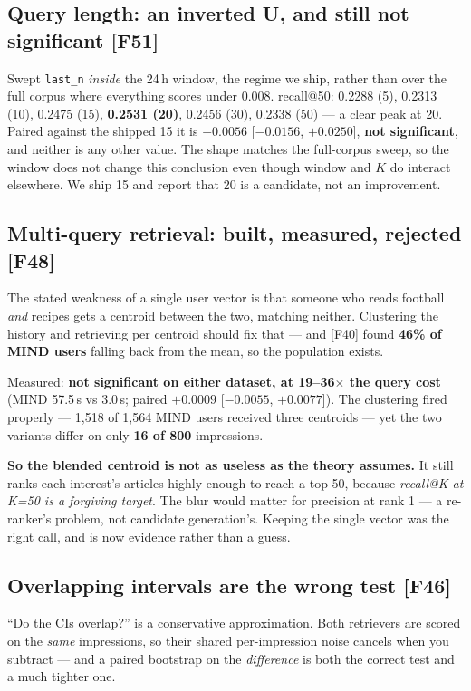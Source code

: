 \documentclass[10pt,a4paper]{article}
\newcommand{\F}[1]{\textcolor{blue!55!black}{\footnotesize[#1]}}
\begin{document}
\subsection{Query length: an inverted U, and still not significant \F{F51}}

Swept \texttt{last\_n} \emph{inside} the 24\,h window, the regime we ship, rather than over the full
corpus where everything scores under 0.008. recall@50: 0.2288 (5), 0.2313 (10), 0.2475 (15),
\textbf{0.2531 (20)}, 0.2456 (30), 0.2338 (50) --- a clear peak at 20. Paired against the shipped 15
it is $+0.0056$ [$-0.0156$, $+0.0250$], \textbf{not significant}, and neither is any other value.
The shape matches the full-corpus sweep, so the window does not change this conclusion even though
window and $K$ do interact elsewhere. We ship 15 and report that 20 is a candidate, not an
improvement.

\subsection{Multi-query retrieval: built, measured, rejected \F{F48}}

The stated weakness of a single user vector is that someone who reads football \emph{and} recipes
gets a centroid between the two, matching neither. Clustering the history and retrieving per centroid
should fix that --- and \F{F40} found \textbf{46\% of MIND users} falling back from the mean, so the
population exists.

Measured: \textbf{not significant on either dataset, at 19--36$\times$ the query cost} (MIND 57.5\,s
vs 3.0\,s; paired $+0.0009$ [$-0.0055$, $+0.0077$]). The clustering fired properly --- 1,518 of 1,564
MIND users received three centroids --- yet the two variants differ on only \textbf{16 of 800}
impressions.

\textbf{So the blended centroid is not as useless as the theory assumes.} It still ranks each
interest's articles highly enough to reach a top-50, because \emph{recall@K at K{=}50 is a forgiving
target}. The blur would matter for precision at rank 1 --- a re-ranker's problem, not candidate
generation's. Keeping the single vector was the right call, and is now evidence rather than a guess.

\subsection{Overlapping intervals are the wrong test \F{F46}}

``Do the CIs overlap?'' is a conservative approximation. Both retrievers are scored on the
\emph{same} impressions, so their shared per-impression noise cancels when you subtract --- and a
paired bootstrap on the \emph{difference} is both the correct test and a much tighter one.
\end{document}
